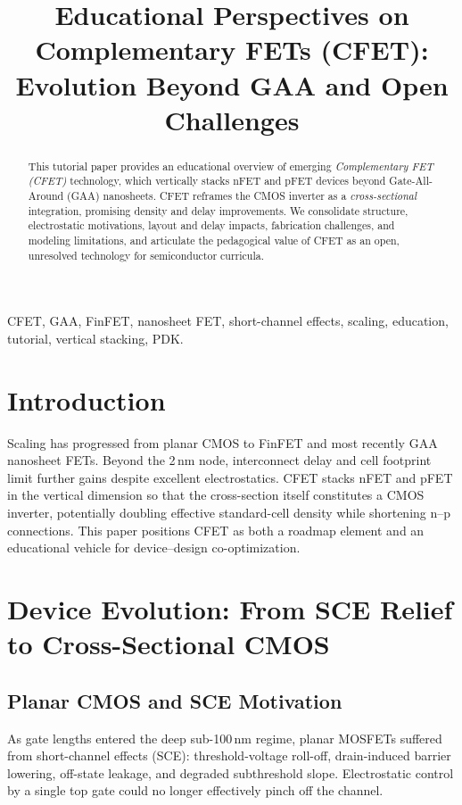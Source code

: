 \documentclass[conference]{IEEEtran}
\title{Educational Perspectives on Complementary FETs (CFET):\\
Evolution Beyond GAA and Open Challenges}
\author{
\IEEEauthorblockN{Shinichi Samizo}
\IEEEauthorblockA{Independent Semiconductor Researcher\\
Project Design Hub, Samizo-AITL\\
\textit{Email:} \href{mailto:shin3t72@gmail.com}{shin3t72@gmail.com}\quad
\textit{GitHub:} \href{https://github.com/Samizo-AITL}{Samizo-AITL}}
}
\begin{document}
\maketitle

\begin{abstract}
This tutorial paper provides an educational overview of emerging
\emph{Complementary FET (CFET)} technology, which vertically stacks nFET and pFET devices beyond Gate-All-Around (GAA) nanosheets.
CFET reframes the CMOS inverter as a \emph{cross-sectional} integration, promising density and delay improvements.
We consolidate structure, electrostatic motivations, layout and delay impacts, fabrication challenges, and modeling limitations, and articulate the pedagogical value of CFET as an open, unresolved technology for semiconductor curricula.
\end{abstract}

\begin{IEEEkeywords}
CFET, GAA, FinFET, nanosheet FET, short-channel effects, scaling, education, tutorial, vertical stacking, PDK.
\end{IEEEkeywords}

\section{Introduction}
Scaling has progressed from planar CMOS to FinFET and most recently GAA nanosheet FETs.
Beyond the 2\,nm node, interconnect delay and cell footprint limit further gains despite excellent electrostatics.
CFET stacks nFET and pFET in the vertical dimension so that the cross-section itself constitutes a CMOS inverter, potentially doubling effective standard-cell density while shortening n--p connections.
This paper positions CFET as both a roadmap element and an educational vehicle for device--design co-optimization.

\section{Device Evolution: From SCE Relief to Cross-Sectional CMOS}
\subsection{Planar CMOS and SCE Motivation}
As gate lengths entered the deep sub-100\,nm regime, planar MOSFETs suffered
from short-channel effects (SCE): threshold-voltage roll-off, drain-induced barrier lowering, off-state leakage, and degraded subthreshold slope.
Electrostatic control by a single top gate could no longer effectively pinch off the channel.
\end{document}
